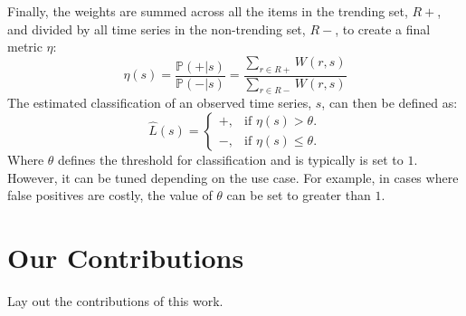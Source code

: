 Finally, the weights are summed across all the items in the trending set, $R+$, and divided by all time series in the non-trending set, $R-$, to create a final metric $\eta$:
\begin{equation}
\eta(s)=\frac{\mathbb{P}(+|s)}{\mathbb{P}{(-|s)}} =\frac{\sum_{r \in R+} W(r,s)}{\sum_{r \in R-}W(r,s)}
\end{equation}
The estimated classification of an observed time series, $s$, can then be defined as:
\begin{equation}
  \hat{L}(s)=\begin{cases}
    +, & \text{if $\eta(s)>\theta$}.\\
    -, & \text{if $\eta(s) \leq \theta$}.
  \end{cases}
\end{equation}
Where $\theta$ defines the threshold for classification and is typically is set to $1$. However, it can be tuned depending on the use case. For example, in cases where false positives are costly, the value of $\theta$ can be set to greater than $1$. 


\section{Our Contributions}
Lay out the contributions of this work.